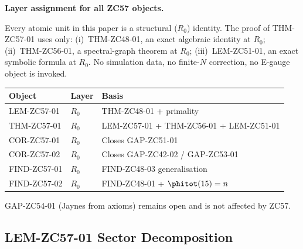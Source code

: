 \documentclass[12pt, a4paper]{article}
\begin{document}
\begin{layerbox}
\textbf{Layer assignment for all ZC57 objects.}

Every atomic unit in this paper is a structural ($R_0$) identity.
The proof of THM-ZC57-01 uses only:
(i)~THM-ZC48-01, an exact algebraic identity at $R_0$;
(ii)~THM-ZC56-01, a spectral-graph theorem at $R_0$;
(iii)~LEM-ZC51-01, an exact symbolic formula at $R_0$.
No simulation data, no finite-$N$ correction, no E-gauge object
is invoked.

\begin{center}
\begin{tabular}{@{}lll@{}}
\toprule
\textbf{Object} & \textbf{Layer} & \textbf{Basis} \\
\midrule
LEM-ZC57-01 & $R_0$ & THM-ZC48-01 + primality \\
THM-ZC57-01 & $R_0$ & LEM-ZC57-01 + THM-ZC56-01 + LEM-ZC51-01 \\
COR-ZC57-01 & $R_0$ & Closes GAP-ZC51-01 \\
COR-ZC57-02 & $R_0$ & Closes GAP-ZC42-02 / GAP-ZC53-01 \\
FIND-ZC57-01 & $R_0$ & FIND-ZC48-03 generalisation \\
FIND-ZC57-02 & $R_0$ & FIND-ZC48-01 + $\phitot(15)=n$ \\
\bottomrule
\end{tabular}
\end{center}

GAP-ZC54-01 (Jaynes from axioms) remains open and is not
affected by ZC57.
\end{layerbox}

\subsection{LEM-ZC57-01 \quad Sector Decomposition}
\label{sec:lem01}

\end{document}
